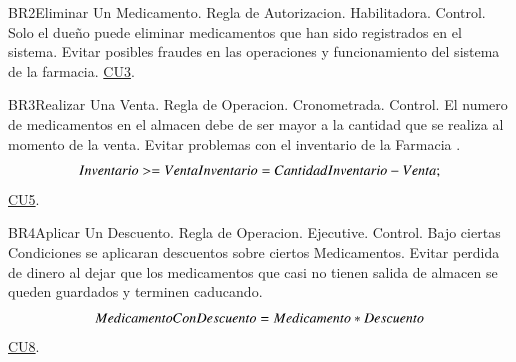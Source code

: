 \begin{BussinesRule}{BR2}{Eliminar Un Medicamento.}
	\BRitem[Tipo:] Regla de Autorizacion. 
	\BRitem[Clase:] Habilitadora. 
	\BRitem[Nivel:] Control. %
	\BRitem[Descripción:]	Solo el dueño puede eliminar medicamentos que han sido registrados en el sistema.
	\BRitem[Motivación:] Evitar posibles fraudes en las operaciones y funcionamiento del sistema de la farmacia.
	 \hyperlink{CU3}{CU3}.
\end{BussinesRule}
\begin{BussinesRule}{BR3}{Realizar Una Venta.}
	\BRitem[Tipo:] Regla de Operacion. 
	\BRitem[Clase:] Cronometrada. 
	\BRitem[Nivel:] Control. %
	\BRitem[Descripción:] El numero de medicamentos en el almacen debe de ser mayor a la cantidad que se realiza al momento de la venta.
	\BRitem[Motivación:] Evitar problemas con el inventario de la Farmacia .
\BRitem[Sentencia:] 
		\begin{displaymath}
			Inventario>=Venta\\
			Inventario= CantidadInventario-Venta;
		\end{displaymath}
	 \hyperlink{CU5}{CU5}.
\end{BussinesRule}

\begin{BussinesRule}{BR4}{Aplicar Un Descuento.}
	\BRitem[Tipo:] Regla de Operacion. 
	\BRitem[Clase:] Ejecutive. 
	\BRitem[Nivel:] Control. %
	\BRitem[Descripción:] Bajo ciertas Condiciones se aplicaran descuentos sobre ciertos Medicamentos.
	\BRitem[Motivación:] Evitar perdida de dinero al dejar que los medicamentos que casi no tienen salida de almacen se queden guardados y terminen caducando.
\BRitem[Sentencia:] 
		\begin{displaymath}
			MedicamentoConDescuento=Medicamento*Descuento\\
		\end{displaymath}
	 \hyperlink{CU8}{CU8}.
\end{BussinesRule}

